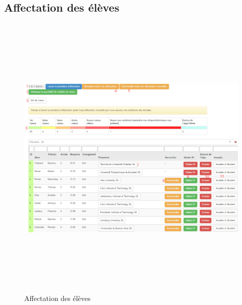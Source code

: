     \subsection{Affectation des élèves}
    \label{ae}
    \begin{figure}[H]
    	\centering
    	\includegraphics[width=16cm,height=14cm]{Images/Admin/moulinette_admin.png}
    	\caption{Affectation des élèves}
    	
    \end{figure}
    
